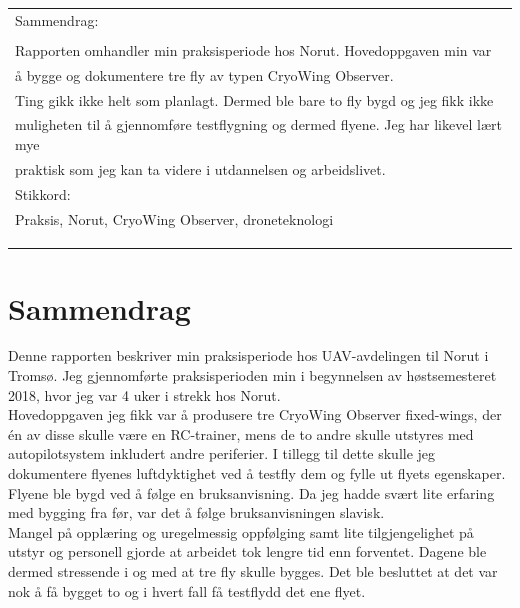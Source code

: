 \documentclass[12pt, a4paper]{article}
\begin{document}
\begin{flushleft}
	\begin{tabular}{ | l | }
		\hline
		Sammendrag: \hspace{14.7cm} \\
		\\
		Rapporten omhandler min praksisperiode hos Norut. Hovedoppgaven min var \\ å bygge og dokumentere tre fly av typen CryoWing Observer. \\
		Ting gikk ikke helt som planlagt. Dermed ble bare to fly bygd og jeg fikk ikke\\
		muligheten til å gjennomføre testflygning og dermed flyene.
		Jeg har likevel lært mye \\ praktisk som 
		jeg kan ta videre i utdannelsen og arbeidslivet.
		\\
		\hline
		Stikkord: \\ Praksis, Norut, CryoWing Observer, droneteknologi\\ \\ \\ \\
		\hline
	\end{tabular}
\end{flushleft}

\clearpage


\section{Sammendrag}
Denne rapporten beskriver min praksisperiode hos UAV-avdelingen til Norut i Tromsø. Jeg gjennomførte praksisperioden min i begynnelsen av høstsemesteret 2018, hvor jeg var 4 uker i strekk hos Norut. \\

Hovedoppgaven jeg fikk var å produsere tre CryoWing Observer fixed-wings, der én av disse skulle være en RC-trainer, mens de to andre skulle utstyres med autopilotsystem inkludert andre periferier. I tillegg til dette skulle jeg dokumentere flyenes luftdyktighet ved å testfly dem og fylle ut flyets egenskaper.\\

Flyene ble bygd ved å følge en bruksanvisning. Da jeg hadde svært lite erfaring med bygging fra før, var det å følge bruksanvisningen slavisk. \\

Mangel på opplæring og uregelmessig oppfølging samt lite tilgjengelighet på utstyr og personell gjorde at arbeidet tok lengre tid enn forventet. Dagene ble dermed stressende i og med at tre fly skulle bygges. Det ble besluttet at det var nok å få bygget to og i hvert fall få testflydd det ene flyet. \\
\end{document}
